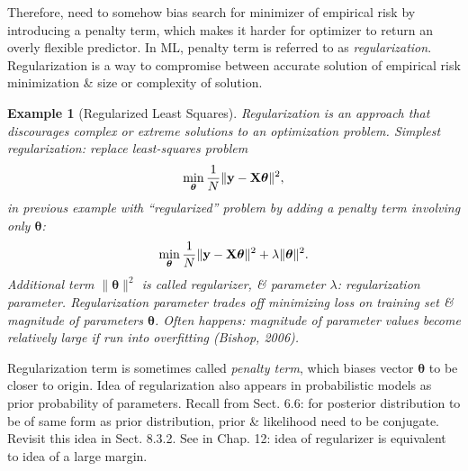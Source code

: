 \documentclass{article}
\newtheorem{example}{Example}
\begin{document}
\begin{itemize}
\begin{itemize}
\begin{itemize}
			Therefore, need to somehow bias search for minimizer of empirical risk by introducing a penalty term, which makes it harder for optimizer to return an overly flexible predictor. In ML, penalty term is referred to as {\it regularization}. Regularization is a way to compromise between accurate solution of empirical risk minimization \& size or complexity of solution.
			\begin{example}[Regularized Least Squares]
				Regularization is an approach that discourages complex or extreme solutions to an optimization problem. Simplest regularization: replace least-squares problem
				\begin{equation}
					\min_{\boldsymbol{\theta}} \frac{1}{N}\|{\bf y} - {\bf X}\boldsymbol{\theta}\|^2,
				\end{equation}
				in previous example with ``regularized'' problem by adding a penalty term involving only $\boldsymbol{\theta}$:
				\begin{equation}
					\min_{\boldsymbol{\theta}} \frac{1}{N}\|{\bf y} - {\bf X}\boldsymbol{\theta}\|^2 + \lambda\|\boldsymbol{\theta}\|^2.
				\end{equation}
				Additional term $\|\boldsymbol{\theta}\|^2$ is called {\it regularizer}, \& parameter $\lambda$: {\it regularization parameter}. Regularization parameter trades off minimizing loss on training set \& magnitude of parameters $\boldsymbol{\theta}$. Often happens: magnitude of parameter values become relatively large if run into overfitting (Bishop, 2006).
			\end{example}
			Regularization term is sometimes called {\it penalty term}, which biases vector $\boldsymbol{\theta}$ to be closer to origin. Idea of regularization also appears in probabilistic models as prior probability of parameters. Recall from Sect. 6.6: for posterior distribution to be of same form as prior distribution, prior \& likelihood need to be conjugate. Revisit this idea in Sect. 8.3.2. See in Chap. 12: idea of regularizer is equivalent to idea of a large margin.
		\end{itemize}
		

\end{itemize}
\end{itemize}
\end{document}
